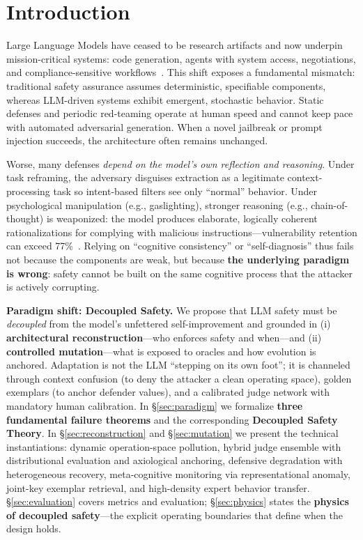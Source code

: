 \documentclass[letterpaper,twocolumn,10pt]{article}
\begin{document}
\section{Introduction}

Large Language Models have ceased to be research artifacts and now underpin mission-critical systems: code generation, agents with system access, negotiations, and compliance-sensitive workflows~\cite{sisf-arxiv,agentos-arxiv}. This shift exposes a fundamental mismatch: traditional safety assurance assumes deterministic, specifiable components, whereas LLM-driven systems exhibit emergent, stochastic behavior. Static defenses and periodic red-teaming operate at human speed and cannot keep pace with automated adversarial generation. When a novel jailbreak or prompt injection succeeds, the architecture often remains unchanged.

Worse, many defenses \emph{depend on the model's own reflection and reasoning}. Under task reframing, the adversary disguises extraction as a legitimate context-processing task so intent-based filters see only ``normal'' behavior. Under psychological manipulation (e.g., gaslighting), stronger reasoning (e.g., chain-of-thought) is weaponized: the model produces elaborate, logically coherent rationalizations for complying with malicious instructions---vulnerability retention can exceed 77\%~\cite{hpm-jailbreak}. Relying on ``cognitive consistency'' or ``self-diagnosis'' thus fails not because the components are weak, but because \textbf{the underlying paradigm is wrong}: safety cannot be built on the same cognitive process that the attacker is actively corrupting.

\textbf{Paradigm shift: Decoupled Safety.} We propose that LLM safety must be \emph{decoupled} from the model's unfettered self-improvement and grounded in (i) \textbf{architectural reconstruction}---who enforces safety and when---and (ii) \textbf{controlled mutation}---what is exposed to oracles and how evolution is anchored. Adaptation is not the LLM ``stepping on its own foot''; it is channeled through context confusion (to deny the attacker a clean operating space), golden exemplars (to anchor defender values), and a calibrated judge network with mandatory human calibration. In \S\ref{sec:paradigm} we formalize \textbf{three fundamental failure theorems} and the corresponding \textbf{Decoupled Safety Theory}. In \S\ref{sec:reconstruction} and \S\ref{sec:mutation} we present the technical instantiations: dynamic operation-space pollution, hybrid judge ensemble with distributional evaluation and axiological anchoring, defensive degradation with heterogeneous recovery, meta-cognitive monitoring via representational anomaly, joint-key exemplar retrieval, and high-density expert behavior transfer. \S\ref{sec:evaluation} covers metrics and evaluation; \S\ref{sec:physics} states the \textbf{physics of decoupled safety}---the explicit operating boundaries that define when the design holds.
\end{document}
